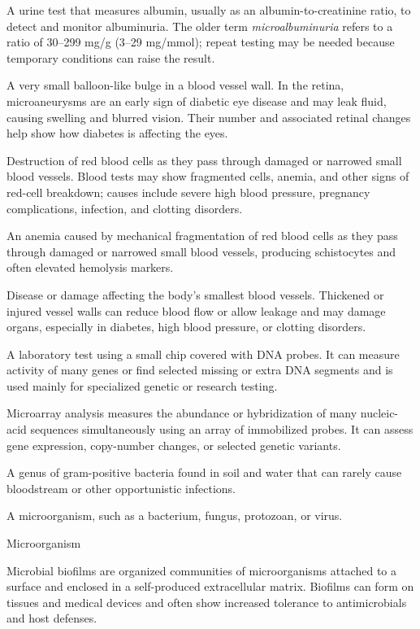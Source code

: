  A urine test that measures albumin, usually as an albumin-to-creatinine ratio, to detect and monitor albuminuria. The older term \textit{microalbuminuria} refers to a ratio of 30--299 mg/g (3--29 mg/mmol); repeat testing may be needed because temporary conditions can raise the result.

 A very small balloon-like bulge in a blood vessel wall. In the retina, microaneurysms are an early sign of diabetic eye disease and may leak fluid, causing swelling and blurred vision. Their number and associated retinal changes help show how diabetes is affecting the eyes.

 Destruction of red blood cells as they pass through damaged or narrowed small blood vessels. Blood tests may show fragmented cells, anemia, and other signs of red-cell breakdown; causes include severe high blood pressure, pregnancy complications, infection, and clotting disorders.

 An anemia caused by mechanical fragmentation of red blood cells as they pass through damaged or narrowed small blood vessels, producing schistocytes and often elevated hemolysis markers.

 Disease or damage affecting the body's smallest blood vessels. Thickened or injured vessel walls can reduce blood flow or allow leakage and may damage organs, especially in diabetes, high blood pressure, or clotting disorders.

 A laboratory test using a small chip covered with DNA probes. It can measure activity of many genes or find selected missing or extra DNA segments and is used mainly for specialized genetic or research testing.

 Microarray analysis measures the abundance or hybridization of many nucleic-acid sequences simultaneously using an array of immobilized probes. It can assess gene expression, copy-number changes, or selected genetic variants.

 A genus of gram-positive bacteria found in soil and water that can rarely cause bloodstream or other opportunistic infections.

 A microorganism, such as a bacterium, fungus, protozoan, or virus.

\synonyms
Microorganism

 Microbial biofilms are organized communities of microorganisms attached to a surface and enclosed in a self-produced extracellular matrix. Biofilms can form on tissues and medical devices and often show increased tolerance to antimicrobials and host defenses.

